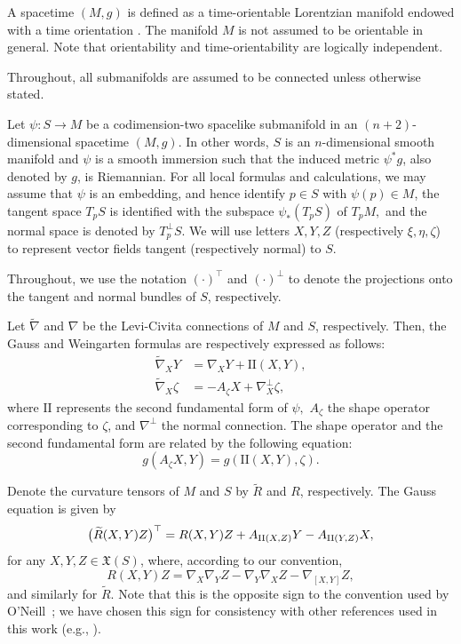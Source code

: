 \documentclass[11pt]{article}
\numberwithin{equation}{section}
\begin{document}
	A spacetime $(M,g)$ is defined as a time-orientable Lorentzian manifold endowed with a time orientation \cite{beem}. The manifold $M$ is not assumed to be  orientable in general. Note that orientability and time-orientability are logically independent.
	
	
		Throughout, all submanifolds are assumed to be connected unless otherwise stated.

		Let $\psi\colon S \to M$ be a codimension-two spacelike submanifold in an $(n+2)$-dimensional spacetime $(M,g).$ In other words, $S$ is an $n$-dimensional smooth manifold and $\psi$ is a smooth immersion such that the induced metric $\psi^*g$, also denoted by $g$, is Riemannian. For all local formulas and calculations, we may assume that $\psi$ is an embedding, and hence identify $p\in S$ with $\psi(p)\in M$, the tangent
	space $T_pS$ is identified with the subspace $\psi_*(T_pS)$ of $T_pM,$ and the normal space is denoted by $T_p^\perp S$. We will use letters $X,Y,Z$ (respectively $\xi,\eta,\zeta$) to represent vector fields tangent (respectively normal) to $S$.
	
	Throughout, we use the notation $(\cdot)^\top$ and $(\cdot)^\perp$ to denote the projections onto the tangent and normal bundles of $S$, respectively.
	
	Let $\widetilde{\nabla}$ and $\nabla$ be the Levi-Civita connections of $M$ and $S$, respectively. Then, the Gauss and Weingarten formulas are respectively expressed as follows:
	\begin{align} 
		\label{fgauss} 
		\widetilde{\nabla}_{X} Y &= \nabla_{X} Y + \mathrm{II}(X,Y),\\ 
		\widetilde{\nabla}_{X} \zeta &= - A_\zeta X + \nabla^\perp_X \zeta, \label{fWeingarten}
	\end{align} 
	where $\mathrm{II}$ represents the second fundamental form of $\psi,$  $A_\zeta$ the shape operator corresponding to $\zeta$, and $\nabla^\perp$ the normal connection. The shape operator and the second fundamental form are related by the following equation:
	\begin{equation} \label{relation}
		g( A_\zeta X, Y) = g( \mathrm{II}(X,Y), \zeta ).
	\end{equation}
	
	Denote the curvature tensors of $M$ and $S$ by $\widetilde{R}$ and $R$, respectively. The Gauss equation is given by
	\begin{equation}
		\bigl(\widetilde{R}(X,Y)Z\bigr)^{\top} = R(X,Y)Z + A_{{\rm II}(X,Z)}Y - A_{{\rm II}(Y,Z)}X, \label{GaussEc}
	\end{equation}
	for any $X, Y, Z \in {\mathfrak X}(S)$, where, according to our convention,
	\begin{equation*}
		R(X,Y)Z = \nabla_X \nabla_Y Z - \nabla_Y \nabla_X Z - \nabla_{[X,Y]}Z,
	\end{equation*}
	and similarly for  ${\widetilde R}$. Note that this is the opposite sign to the convention used by O'Neill~\cite[p.~74]{oneill}; we have chosen this sign for consistency with other references used in this work (e.g., \cite{beem, Dajczerbook, Duggal_Sahin}).
	
\end{document}
